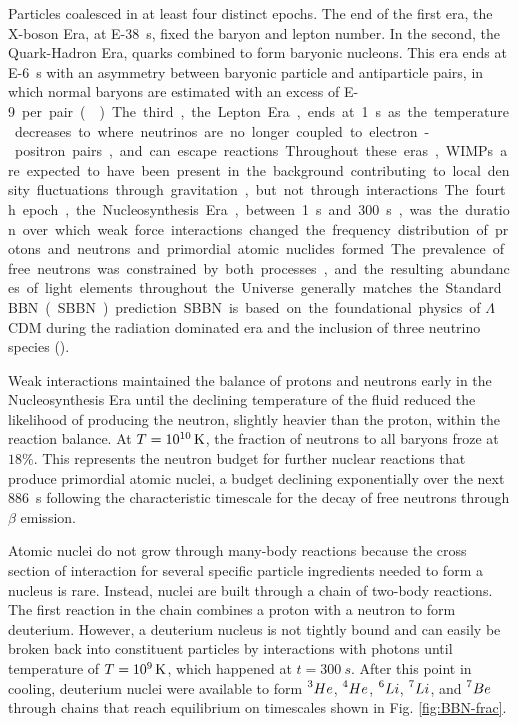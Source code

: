 \documentclass{paper}
\begin{document}
  Particles coalesced in at least four distinct epochs. The end of the first era,
  the X-boson Era, at \SI{E-38}{s}, fixed the baryon and lepton number. 
  In the second, the Quark-Hadron Era, quarks combined to form baryonic 
  nucleons. This era ends at \SI{E-6}{s} with an asymmetry between baryonic
  particle and antiparticle pairs, in which normal baryons are estimated with an 
  excess of \SI{E-9} per pair (\cite{1993PhRvL..70.2833F}). The third, the 
  Lepton Era, ends at \SI{1}{s} as the temperature decreases to 
  where neutrinos are no longer coupled to electron-positron pairs, and can 
  escape reactions. Throughout these eras, WIMPs are expected to have been 
  present in the background contributing to local density fluctuations 
  through gravitation, but not through interactions.

  The fourth epoch, the Nucleosynthesis Era, between \SI{1}{s} and 
  \SI{300}{s}, was the duration over which weak force interactions changed
  the frequency distribution of protons and neutrons and primordial atomic 
  nuclides formed. The prevalence of free neutrons was constrained by both
  processes, and the resulting abundances of light elements throughout the 
  Universe generally matches the Standard BBN (SBBN)
  prediction. SBBN is based on the foundational physics of $\Lambda$CDM 
  during the radiation dominated era and the inclusion of three neutrino 
  species (\cite{Cyburt_2016}). 

  Weak interactions maintained the balance of protons and neutrons early in
  the Nucleosynthesis Era until the declining temperature of the fluid reduced 
  the likelihood of producing the neutron, slightly heavier than the proton, 
  within the reaction balance. At \(T = \SI{E10}{K}\), the fraction of 
  neutrons to all baryons froze at \(18\%\). This represents the neutron 
  budget for further nuclear reactions that produce primordial atomic nuclei, a budget
  declining exponentially over the next \SI{886}{s} following the 
  characteristic timescale for the decay of free neutrons through \(\beta\)
  emission.

  Atomic nuclei do not grow through many-body reactions 
  because the cross section of interaction for several specific particle
  ingredients needed to form a nucleus is rare. Instead, nuclei are built
  through a chain of two-body reactions. The first reaction in the chain
  combines a proton with a neutron to form deuterium. However, a deuterium
  nucleus is not tightly bound and can easily be broken back into constituent
  particles by interactions with photons until temperature of
  \(T = \SI{E9}{K}\), which happened at \(t = \SI{300}{s}\). After this point in cooling, 
  deuterium nuclei were available to form \(\prescript{3}{}{He}\), 
  \(\prescript{4}{}{He}\), \(\prescript{6}{}{Li}\), \(\prescript{7}{}{Li}\), 
  and \(\prescript{7}{}{Be}\) through chains that reach equilibrium on
  timescales shown in Fig. \ref{fig:BBN-frac}.
\end{document}
